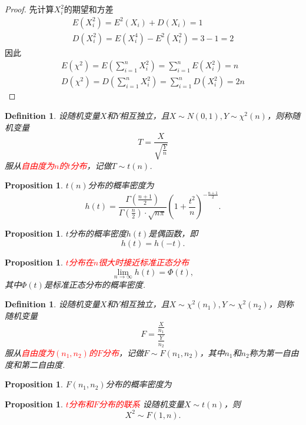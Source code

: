 \documentclass{article}
\newtheorem{proposition}[theorem]{Proposition}
\newtheorem{definition}[theorem]{Definition}
\newcommand{\redt}[1]{\textcolor{red}{#1}}
\begin{document}
\begin{proof}
先计算$X_i^2$的期望和方差
$$
\begin{array}{ll}
E(X_i^2) = E^2(X_i) + D(X_i) = 1 \\
D(X_i^2) = E(X_i^4) - E^2(X_i^2) = 3-1 = 2
\end{array}
$$
因此
$$
\begin{array}{ll}
E(\chi^2) = E(\sum\limits_{i=1}^n X_i^2) =\sum\limits_{i=1}^n E(X_i^2) = n \\
D(\chi^2) = D(\sum\limits_{i=1}^n X_i^2) =\sum\limits_{i=1}^n D(X_i^2) = 2n 
\end{array}
$$
\end{proof}


\begin{definition}
\rm 设随机变量$X$和$Y$相互独立，且$X \sim N(0,1), Y \sim \chi^2(n)$，则称随机变量
$$
T = \frac{X}{\sqrt{\frac{Y}{n}}}
$$
服从\redt{自由度为$n$的$t$分布}，记做$T\sim t(n)$.
\end{definition}

\begin{proposition}
\rm $t(n)$分布的概率密度为
$$
h(t) =\frac{\Gamma(\frac{n+1}{2})}{\Gamma(\frac{n}{2})\cdot \sqrt{n\pi}}\left(1+\frac{t^2}{n}\right)^{-\frac{n+1}{2}}.
$$
\end{proposition}

\begin{proposition}
\rm $t$分布的概率密度$h(t)$是偶函数，即
$$
h(t)=h(-t).
$$
\end{proposition}

\begin{proposition}
\rm \redt{$t$分布在$n$很大时接近标准正态分布}
$$
\lim\limits_{n \to \infty} h(t) = \Phi(t),
$$
其中$\Phi(t)$是标准正态分布的概率密度. 
\end{proposition}

\begin{definition}
\rm 设随机变量$X$和$Y$相互独立，且$X \sim \chi^2(n_1), Y \sim \chi^2(n_2)$，则称随机变量
$$
F = \frac{\frac{X}{n_1}}{\frac{Y}{n_2}}
$$
服从\redt{自由度为$(n_1,n_2)$的$F$分布}，记做$F \sim F(n_1,n_2)$，其中$n_1$和$n_2$称为第一自由度和第二自由度. 
\end{definition}

\begin{proposition}
\rm $F(n_1,n_2)$分布的概率密度为
\end{proposition}

\begin{proposition}
\rm \redt{$t$分布和$F$分布的联系} 设随机变量$X \sim t(n)$，则
$$
X^2 \sim F(1,n). 
$$
\end{proposition}
\end{document}
